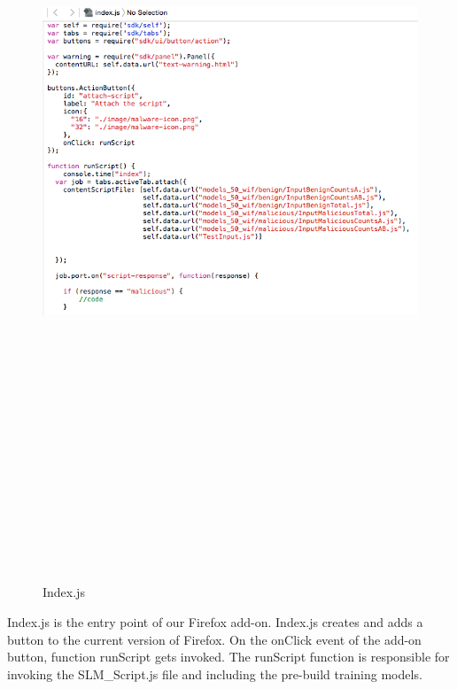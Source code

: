 \begin{figure}[htb]
\centering
\includegraphics[width=16cm,height=25cm,keepaspectratio]{image/indexFile.png}
\caption[Index.js]{Index.js} 
\label{fig:indexFile}
\end{figure}

Index.js is the entry point of our Firefox add-on. Index.js creates and adds a button to the current version of Firefox. On the onClick event of the add-on button, function runScript gets invoked. The runScript function is responsible for invoking the SLM\_Script.js file and including the pre-build training models.

